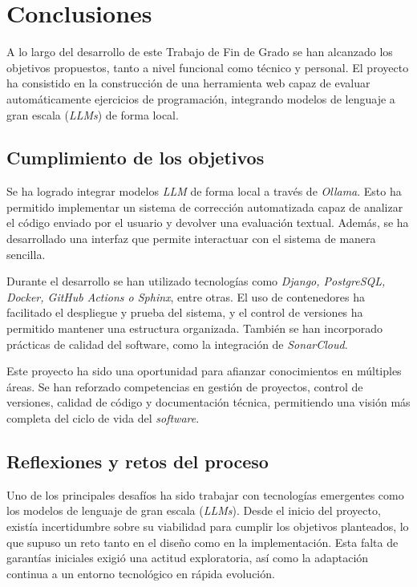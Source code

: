 
\section{Conclusiones}

A lo largo del desarrollo de este Trabajo de Fin de Grado se han alcanzado los objetivos propuestos, tanto a nivel funcional como técnico y personal. El proyecto ha consistido en la construcción de una herramienta web capaz de evaluar automáticamente ejercicios de programación, integrando modelos de lenguaje a gran escala (\textit{LLMs}) de forma local.

\subsection{Cumplimiento de los objetivos}

Se ha logrado integrar modelos \textit{LLM} de forma local a través de \textit{Ollama}. Esto ha permitido implementar un sistema de corrección automatizada capaz de analizar el código enviado por el usuario y devolver una evaluación textual. Además, se ha desarrollado una interfaz que permite interactuar con el sistema de manera sencilla.

Durante el desarrollo se han utilizado tecnologías como \textit{Django, PostgreSQL, Docker, GitHub Actions o Sphinx}, entre otras. El uso de contenedores ha facilitado el despliegue y prueba del sistema, y el control de versiones ha permitido mantener una estructura organizada. También se han incorporado prácticas de calidad del software, como la integración de \textit{SonarCloud}.

Este proyecto ha sido una oportunidad para afianzar conocimientos en múltiples áreas. Se han reforzado competencias en gestión de proyectos, control de versiones, calidad de código y documentación técnica, permitiendo una visión más completa del ciclo de vida del \textit{software}. 

\subsection{Reflexiones y retos del proceso}

Uno de los principales desafíos ha sido trabajar con tecnologías emergentes como los modelos de lenguaje de gran escala (\textit{LLMs}). Desde el inicio del proyecto, existía incertidumbre sobre su viabilidad para cumplir los objetivos planteados, lo que supuso un reto tanto en el diseño como en la implementación. Esta falta de garantías iniciales exigió una actitud exploratoria, así como la adaptación continua a un entorno tecnológico en rápida evolución.

